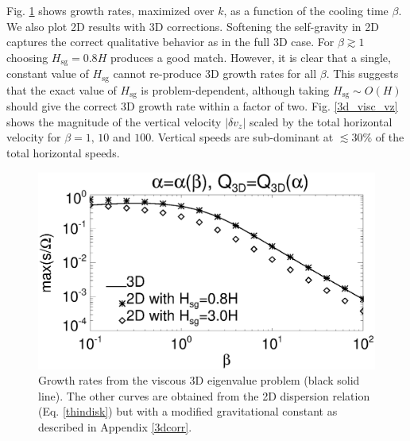 Fig. \ref{3d_visc} shows growth rates, maximized over $k$, as a
function of the cooling time $\beta$. We also plot 2D results with 3D
corrections. Softening the self-gravity in 2D captures the correct 
qualitative behavior as in the full 3D case. For $\beta\gtrsim 1$
choosing $H_\mathrm{sg}=0.8H$ produces a good match. However, it is
clear that a single, constant value of $H_\mathrm{sg}$ cannot
re-produce 3D growth rates for all $\beta$. This suggests that the
exact value of $H_\mathrm{sg}$ is problem-dependent, although taking 
$H_\mathrm{sg}\sim O(H)$ should give the correct 3D growth rate within 
a factor of two. 
Fig. \ref{3d_visc_vz} shows the magnitude of the vertical velocity
$|\delta v_z|$ scaled by the total horizontal velocity for $\beta =
1,\,10$ and $100$. Vertical speeds are sub-dominant at $\lesssim 30\%$
of the total horizontal speeds. 

\begin{figure}
  \includegraphics[width=\linewidth,clip=true,trim=0cm 0.cm 0.cm
    0.0cm]{figures/growth_visc3d}
  \caption{Growth rates from the viscous 3D eigenvalue problem (black solid
    line). The other curves are obtained from the 2D dispersion
    relation (Eq. \ref{thindisk}) but with a modified gravitational
    constant as described in Appendix \ref{3dcorr}. \label{3d_visc}}
\end{figure}



